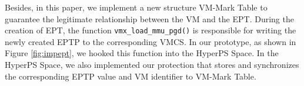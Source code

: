Besides, in this paper, we implement a new structure VM-Mark Table to guarantee the legitimate relationship between the VM and the EPT. 
During the creation of EPT, the function \verb|vmx_load_mmu_pgd()| is responsible for writing the newly created EPTP to the corresponding VMCS.
In our prototype, as shown in Figure \ref{fig:impept}, we hooked this function into the HyperPS Space. In the HyperPS Space, we also implemented our protection that stores and synchronizes the corresponding EPTP value and VM identifier to VM-Mark Table. 

